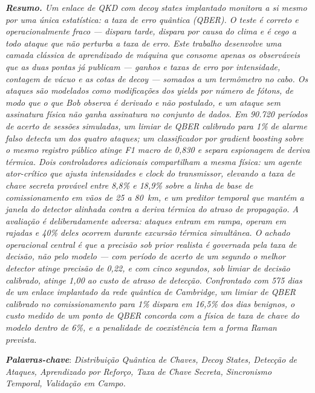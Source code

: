 \documentclass[12pt]{article}
\newenvironment{sbcabstract}[1]
  {\begin{list}{}{\setlength{\leftmargin}{1.2em}\setlength{\rightmargin}{1.2em}}%
   \item[]\itshape\textbf{\upshape\textit{#1}}\hspace{0.4em}}
  {\end{list}}
\begin{document}
\begin{sbcabstract}{Resumo.}
Um enlace de QKD com \emph{decoy states} implantado monitora a si mesmo por uma
única estatística: a taxa de erro quântica (QBER). O teste é correto e
operacionalmente fraco --- dispara tarde, dispara por causa do clima e é cego a
todo ataque que não perturba a taxa de erro. Este trabalho desenvolve uma camada
clássica de aprendizado de máquina que consome apenas os observáveis que as duas
pontas já publicam --- ganhos e taxas de erro por intensidade, contagem de vácuo
e as cotas de \emph{decoy} --- somados a um termômetro no cabo. Os ataques são
modelados como modificações dos \emph{yields} por número de fótons, de modo que o
que Bob observa é derivado e não postulado, e um ataque sem assinatura física não
ganha assinatura no conjunto de dados. Em 90.720 períodos de acerto de sessões
simuladas, um limiar de QBER calibrado para 1\% de alarme falso detecta um dos
quatro ataques; um classificador por \emph{gradient boosting} sobre o mesmo
registro público atinge F1 macro de 0,830 e separa espionagem de deriva térmica.
Dois controladores adicionais compartilham a mesma física: um agente
ator-crítico que ajusta intensidades e \emph{clock} do transmissor, elevando a
taxa de chave secreta provável entre 8,8\% e 18,9\% sobre a linha de base de
comissionamento em vãos de 25 a 80~km, e um preditor temporal que mantém a janela
do detector alinhada contra a deriva térmica do atraso de propagação. A avaliação
é deliberadamente adversa: ataques entram em rampa, operam em rajadas e 40\% deles
ocorrem durante excursão térmica simultânea. O achado operacional central é que a
precisão sob prior realista é governada pela taxa de decisão, não pelo modelo ---
com período de acerto de um segundo o melhor detector atinge precisão de 0,22, e
com cinco segundos, sob limiar de decisão calibrado, atinge 1,00 ao custo de
atraso de detecção. Confrontado com 575 dias de um enlace implantado da rede
quântica de Cambridge, um limiar de QBER calibrado no comissionamento para 1\%
dispara em 16,5\% dos dias benignos, o custo medido de um ponto de QBER concorda
com a física de taxa de chave do modelo dentro de 6\%, e a penalidade de
coexistência tem a forma Raman prevista.
\end{sbcabstract}

\vspace{0.4em}
\noindent\textbf{\textit{Palavras-chave}}: \textit{Distribuição Quântica de Chaves,
Decoy States, Detecção de Ataques, Aprendizado por Reforço, Taxa de Chave Secreta,
Sincronismo Temporal, Validação em Campo.}
\end{document}
